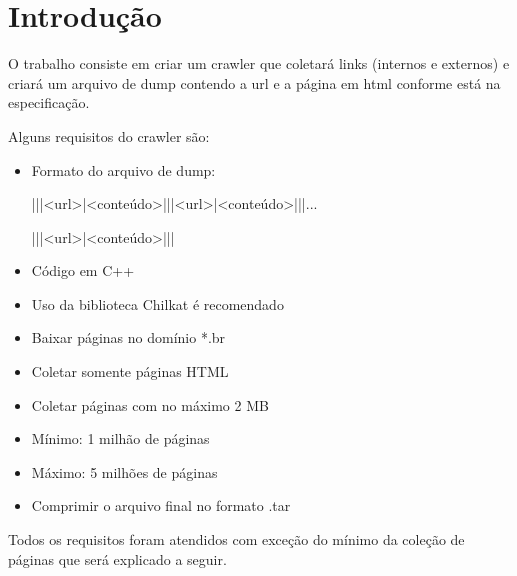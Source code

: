 \section{Introdução} O trabalho consiste em criar um crawler que coletará
links (internos e externos) e criará um arquivo de dump contendo a url e a
página em html conforme está na especificação.

Alguns requisitos do crawler são:



\begin{itemize}
  \item{Formato do arquivo de dump:}

  |||<url>|<conteúdo>|||<url>|<conteúdo>|||...

  |||<url>|<conteúdo>|||


  \item{Código em C++}
  \item{Uso da biblioteca Chilkat é recomendado}
  \item{Baixar páginas no domínio *.br}
  \item{Coletar somente páginas HTML}
  \item{Coletar páginas com no máximo 2 MB}
  \item{Mínimo: 1 milhão de páginas}
  \item{Máximo: 5 milhões de páginas}
  \item{Comprimir o arquivo final no formato .tar}
\end{itemize}

Todos os requisitos foram atendidos com exceção do mínimo da
coleção de páginas que será explicado a seguir.

